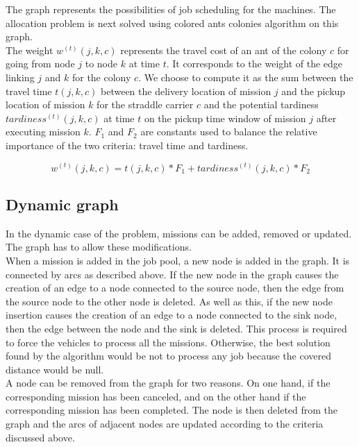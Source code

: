 \documentclass[a4paper,10pt]{article}
\begin{document}
The graph represents the possibilities of job scheduling for the machines. The allocation problem is next solved using colored ants colonies algorithm on this graph.\\


The weight $w^{(t)}(j,k,c)$ represents the travel cost of an ant of the colony $c$ for going from node $j$ to node $k$ at time $t$. It corresponds to the weight of the edge linking $j$ and $k$ for the colony $c$. We choose to compute it as the sum between the travel time $t(j,k,c)$ between the delivery location of mission $j$ and the pickup location of mission $k$ for the straddle carrier $c$ and the potential tardiness $tardiness^{(t)}(j,k,c)$ at time $t$ on the pickup time window of mission $j$ after executing mission $k$. $F_1$ and $F_2$ are constants used to balance the relative importance of the two criteria: travel time and tardiness.

\begin{equation*}
  w^{(t)}(j,k,c) = t(j,k,c)*F_1 + tardiness^{(t)}(j,k,c)*F_2
\end{equation*}

\subsection{Dynamic graph}
In the dynamic case of the problem, missions can be added, removed or updated. The graph has to allow these modifications.\\

When a mission is added in the job pool, a new node is added in the graph. It is connected by arcs as described above. If the new node in the graph causes the creation of an edge to a node connected to the source node, then the edge from the source node to the other node is deleted. As well as this, if the new node insertion causes the creation of an edge to a node connected to the sink node, then the edge between the node and the sink is deleted. This process is required to force the vehicles to process all the missions. Otherwise, the best solution found by the algorithm would be not to process any job because the covered distance would be null.
\\

A node can be removed from the graph for two reasons. On one hand, if the corresponding mission has been canceled, and on the other hand if the corresponding mission has been completed. The node is then deleted from the graph and the arcs of adjacent nodes are updated according to the criteria discussed above.
\\
\end{document}
